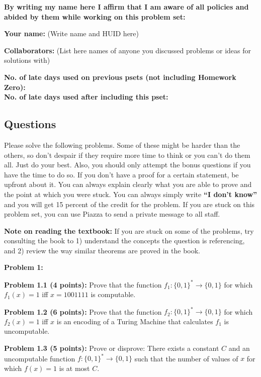 \documentclass[11pt]{article}
\begin{document}
	\textbf{By writing my name here I affirm that I am aware of all policies
		and abided by them while working on this problem set:}
	
	\textbf{Your name:} (Write name and HUID here)
	
	\textbf{Collaborators:} (List here names of anyone you discussed
	problems or ideas for solutions with)
	
	\textbf{No. of late days used on previous psets (not including Homework Zero): }\\
	\textbf{No. of late days used after including this pset: }
	
	
	\newpage
	
	\subsection*{Questions}\label{questions}


Please solve the following problems. Some of these might be harder than
the others, so don't despair if they require more time to think or you
can't do them all. Just do your best. Also, you should only attempt the
bonus questions if you have the time to do so. If you don't have a proof
for a certain statement, be upfront about it. You can always explain
clearly what you are able to prove and the point at which you were
stuck. 
You can always simply write
\textbf{``I don't know''} and you will get 15 percent of the credit for
the problem. If you are stuck on this problem set, you can use Piazza to
send a private message to all staff.


\textbf{Note on reading the textbook:} If you are stuck on some of the
problems, try consulting the book to 1) understand the concepts the
question is referencing, and 2) review the way similar theorems are
proved in the book.

\newcommand{\HALT}{\mathrm{HALT}}
\newcommand{\SPACEHOG}{\textrm{SPACE-HOG}}

\textbf{Problem 1:}

\textbf{Problem 1.1 (4 points):} Prove that the function $f_1:\{0,1\}^* \to \{0,1\}$ for which $f_1(x) = 1$ iff $x = 1001111$ is computable.

\textbf{Problem 1.2 (6 points):} Prove that the function $f_2:\{0,1\}^* \to \{0,1\}$ for which $f_2(x) = 1$ iff $x$ is an encoding of a Turing Machine that calculates $f_1$ is uncomputable.

\textbf{Problem 1.3 (5 points):} Prove or disprove: There exists a constant $C$ and an uncomputable function $f:\{0,1\}^* \to \{0,1\}$ such that the number of values of $x$ for which $f(x)=1$ is at most $C$. %
\end{document}
